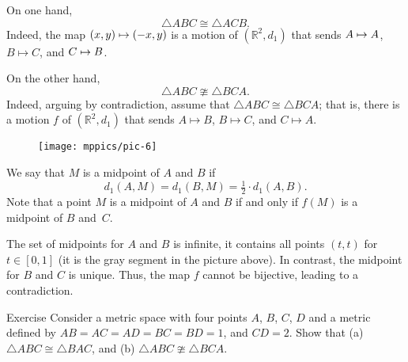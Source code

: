 On one hand,
$$\triangle ABC\cong \triangle ACB.$$
Indeed, the map $(x,y)\mapsto (-x,y)$ is a motion of $(\mathbb{R}^2,d_1)$
that sends $A\mapsto A$, $B\mapsto C$, and $C\mapsto B$.

On the other hand,
$$\triangle ABC\ncong \triangle BCA.$$
Indeed, arguing by contradiction, assume that $\triangle ABC\cong \triangle BCA$; that is, there is a motion $f$ of $(\mathbb{R}^2,d_1)$ that sends $A\mapsto B$, $B\mapsto C$, and $C\mapsto A$.

\begin{wrapfigure}[6]{o}{33mm}
\vskip-5mm
\centering
\texttt{[image: mppics/pic-6]}
\end{wrapfigure}

We say that $M$ is a midpoint of $A$ and $B$ if 
\[d_1(A,M)=d_1(B,M)=\tfrac12\cdot d_1(A,B).\]
Note that a point $M$ is a midpoint of $A$ and $B$ if and only if $f(M)$ is a midpoint of $B$ and~$C$.

The set of midpoints for $A$ and $B$ is infinite, it contains all points $(t,t)$ for $t\in[0,1]$ (it is the gray segment in the picture above).
In contrast, the midpoint for $B$ and $C$ is unique.
Thus, the map $f$ cannot be bijective, leading to a contradiction.

\begin{thm}{Exercise}\label{ex:ncong}
Consider a metric space with four points $A$, $B$, $C$, $D$ and a metric defined by $AB=AC=AD=BC=BD=1$, and 
$CD=2$.
Show that (a) $\triangle ABC\cong \triangle BAC$, and (b) $\triangle ABC\ncong \triangle BCA$.
\end{thm}


